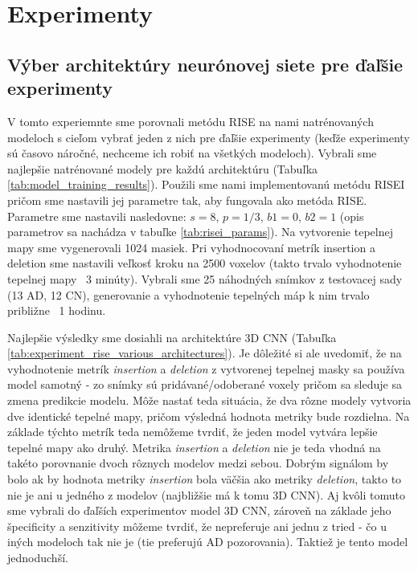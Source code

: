 \section{Experimenty}

\subsection{Výber architektúry neurónovej siete pre ďaľšie experimenty \label{sec:experiment_rise_various_architectures}}

V tomto experiemnte sme porovnali metódu RISE na nami natrénovaných modeloch s cieľom vybrať jeden z nich pre ďaľšie experimenty (keďže experimenty sú časovo náročné, nechceme ich robiť na všetkých modeloch). Vybrali sme najlepšie natrénované modely pre každú architektúru (Tabuľka \ref{tab:model_training_results}). Použili sme nami implementovanú metódu RISEI pričom sme nastavili jej parametre tak, aby fungovala ako metóda RISE.
Parametre sme nastavili nasledovne: $s = 8$, $p = 1/3$, $b1 = 0$, $b2 = 1$ (opis parametrov sa nachádza v tabuľke \ref{tab:risei_params}). Na vytvorenie tepelnej mapy sme vygenerovali 1024 masiek. Pri vyhodnocovaní metrík insertion a deletion sme nastavili veľkosť kroku na 2500 voxelov (takto trvalo vyhodnotenie tepelnej mapy ~3 minúty). Vybrali sme 25 náhodných snímkov z testovacej sady (13 AD, 12 CN), generovanie a vyhodnotenie tepelných máp k nim trvalo približne ~1 hodinu. 

Najlepšie výsledky sme dosiahli na architektúre 3D CNN (Tabuľka \ref{tab:experiment_rise_various_architectures}). Je dôležité si ale uvedomiť, že na vyhodnotenie metrík \textit{insertion} a \textit{deletion} z vytvorenej tepelnej masky sa používa model samotný - zo snímky sú pridávané/odoberané voxely pričom sa sleduje sa zmena predikcie modelu. Môže nastať teda situácia, že dva rôzne modely vytvoria dve identické tepelné mapy, pričom výsledná hodnota metriky bude rozdielna. Na základe týchto metrík teda nemôžeme tvrdiť, že jeden model vytvára lepšie tepelné mapy ako druhý. Metrika \textit{insertion} a \textit{deletion} nie je teda vhodná na takéto porovnanie dvoch rôznych modelov medzi sebou.
Dobrým signálom by bolo ak by hodnota metriky \textit{insertion} bola väčšia ako metriky \textit{deletion}, takto to nie je ani u jedného z modelov (najbližšie má k tomu 3D CNN). Aj kvôli tomuto sme vybrali do ďaľších experimentov model 3D CNN, zároveň na základe jeho špecificity a senzitivity môžeme tvrdiť, že nepreferuje ani jednu z tried - čo u iných modeloch tak nie je (tie preferujú AD pozorovania). Taktiež je tento model jednoduchší.

